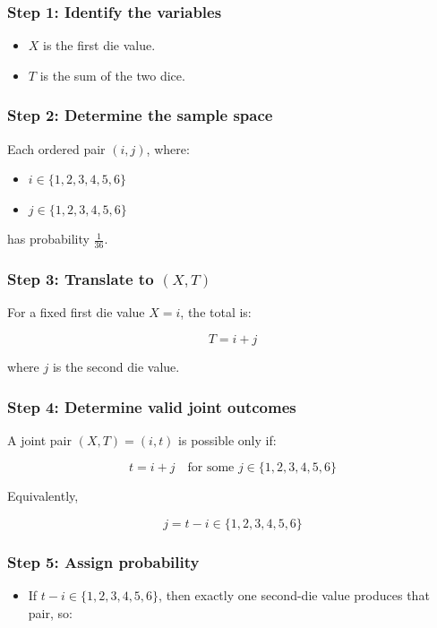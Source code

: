 \documentclass[12pt]{article}
\begin{document}
\subsubsection*{Step 1: Identify the variables}

\begin{itemize}
    \item \(X\) is the first die value.
    \item \(T\) is the sum of the two dice.
\end{itemize}

\subsubsection*{Step 2: Determine the sample space}

Each ordered pair \((i,j)\), where:

\begin{itemize}
    \item \(i \in \{1,2,3,4,5,6\}\)
    \item \(j \in \{1,2,3,4,5,6\}\)
\end{itemize}

has probability \(\frac{1}{36}\).

\subsubsection*{Step 3: Translate to \((X,T)\)}

For a fixed first die value \(X=i\), the total is:

\[
T=i+j
\]

where \(j\) is the second die value.

\subsubsection*{Step 4: Determine valid joint outcomes}

A joint pair \((X,T)=(i,t)\) is possible only if:

\[
t=i+j \quad \text{for some } j \in \{1,2,3,4,5,6\}
\]

Equivalently,

\[
j=t-i \in \{1,2,3,4,5,6\}
\]

\subsubsection*{Step 5: Assign probability}

\begin{itemize}
    \item If \(t-i \in \{1,2,3,4,5,6\}\), then exactly one second-die value produces that pair, so:
\end{itemize}
\end{document}
